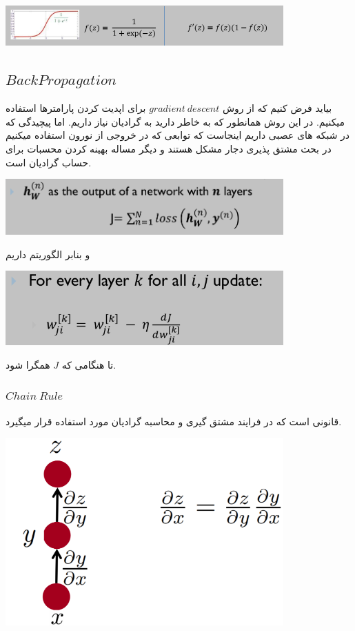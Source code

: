 \documentclass[12pt]{article}
\begin{document}
\includegraphics[width= 0.8\textwidth]{figs/sigmoid.png}


\subsection*{$BackPropagation$}
بیاید فرض کنیم که از روش 
$gradient\:descent$
برای اپدیت کردن پارامترها استفاده میکنیم. در این روش همانطور که به خاطر دارید به گرادیان نیاز داریم. اما پیچیدگی که در شبکه های عصبی داریم اینجاست که توابعی که در خروجی از نورون استفاده میکنیم در بحث مشتق پذیری دجار مشکل هستند و دیگر مساله بهینه کردن محسبات برای حساب گرادیان است.

\includegraphics[width= 0.8\textwidth]{figs/img1.png}


و بنابر الگوریتم داریم 

\includegraphics[width= 0.8\textwidth]{figs/img2.png}

تا هنگامی که 
$J$
همگرا شود.

\subsubsection*{$Chain\:Rule$}
قانونی است که در فرایند مشتق گیری و محاسبه گرادیان مورد استفاده قرار میگیرد.

\includegraphics[width= 0.8\textwidth]{figs/chainRule.png}
\end{document}
